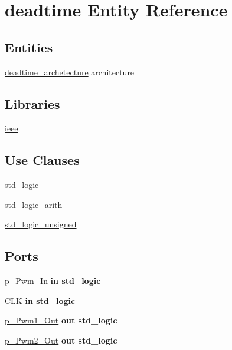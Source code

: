 \hypertarget{classdeadtime}{}\section{deadtime Entity Reference}
\label{classdeadtime}
\subsection*{Entities}
\begin{DoxyCompactItemize}
\item 
\hyperlink{classdeadtime_1_1deadtime__archetecture}{deadtime\+\_\+archetecture} architecture
\end{DoxyCompactItemize}
\subsection*{Libraries}
 \begin{DoxyCompactItemize}
\item 
\hyperlink{classdeadtime_a0a6af6eef40212dbaf130d57ce711256}{ieee} 
\end{DoxyCompactItemize}
\subsection*{Use Clauses}
 \begin{DoxyCompactItemize}
\item 
\hyperlink{classdeadtime_acd03516902501cd1c7296a98e22c6fcb}{std\+\_\+logic\+\_}   
\item 
\hyperlink{classdeadtime_a0f5ecc6613f63d07f7963a97b1b26095}{std\+\_\+logic\+\_\+arith}   
\item 
\hyperlink{classdeadtime_a598da929e807d58939b47499e8bc9fa8}{std\+\_\+logic\+\_\+unsigned}   
\end{DoxyCompactItemize}
\subsection*{Ports}
 \begin{DoxyCompactItemize}
\item 
\hyperlink{classdeadtime_add98662948c2105b77ab5e8fc7f07f86}{p\+\_\+\+Pwm\+\_\+\+In}  {\bfseries {\bfseries \textcolor{keywordflow}{in}\textcolor{vhdlchar}{ }}} {\bfseries \textcolor{comment}{std\+\_\+logic}\textcolor{vhdlchar}{ }} 
\item 
\hyperlink{classdeadtime_ab5d0ea9e968d49d94da9db07a979d402}{C\+L\+K}  {\bfseries {\bfseries \textcolor{keywordflow}{in}\textcolor{vhdlchar}{ }}} {\bfseries \textcolor{comment}{std\+\_\+logic}\textcolor{vhdlchar}{ }} 
\item 
\hyperlink{classdeadtime_a629edf1594d9c8b1a0844cd27222067a}{p\+\_\+\+Pwm1\+\_\+\+Out}  {\bfseries {\bfseries \textcolor{keywordflow}{out}\textcolor{vhdlchar}{ }}} {\bfseries \textcolor{comment}{std\+\_\+logic}\textcolor{vhdlchar}{ }} 
\item 
\hyperlink{classdeadtime_a9dab8115e08009b8436cc7f0c07b5e0c}{p\+\_\+\+Pwm2\+\_\+\+Out}  {\bfseries {\bfseries \textcolor{keywordflow}{out}\textcolor{vhdlchar}{ }}} {\bfseries \textcolor{comment}{std\+\_\+logic}\textcolor{vhdlchar}{ }} 
\end{DoxyCompactItemize}



